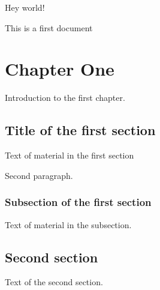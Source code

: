 \documentclass{book}
\begin{document}
Hey world!

This is a first document

\chapter{Chapter One}
Introduction to the first chapter.


\section{Title of the first section}
Text of material in the first section

Second paragraph.

\subsection{Subsection of the first section}

Text of material in the subsection.


\section{Second section}

Text of the second section.
\end{document}
